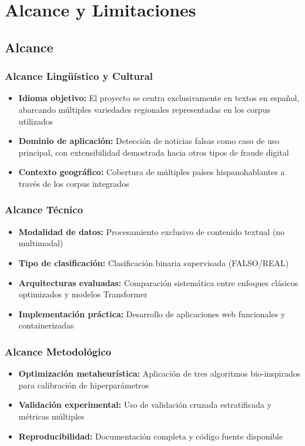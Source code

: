 \section{Alcance y Limitaciones}

\subsection{Alcance}

\subsubsection{Alcance Lingüístico y Cultural}
\begin{itemize}
    \item \textbf{Idioma objetivo:} El proyecto se centra exclusivamente en textos en español, abarcando múltiples variedades regionales representadas en los corpus utilizados
    \item \textbf{Dominio de aplicación:} Detección de noticias falsas como caso de uso principal, con extensibilidad demostrada hacia otros tipos de fraude digital
    \item \textbf{Contexto geográfico:} Cobertura de múltiples países hispanohablantes a través de los corpus integrados
\end{itemize}

\subsubsection{Alcance Técnico}
\begin{itemize}
    \item \textbf{Modalidad de datos:} Procesamiento exclusivo de contenido textual (no multimodal)
    \item \textbf{Tipo de clasificación:} Clasificación binaria supervisada (FALSO/REAL)
    \item \textbf{Arquitecturas evaluadas:} Comparación sistemática entre enfoques clásicos optimizados y modelos Transformer
    \item \textbf{Implementación práctica:} Desarrollo de aplicaciones web funcionales y containerizadas
\end{itemize}

\subsubsection{Alcance Metodológico}
\begin{itemize}
    \item \textbf{Optimización metaheurística:} Aplicación de tres algoritmos bio-inspirados para calibración de hiperparámetros
    \item \textbf{Validación experimental:} Uso de validación cruzada estratificada y métricas múltiples
    \item \textbf{Reproducibilidad:} Documentación completa y código fuente disponible
\end{itemize}

